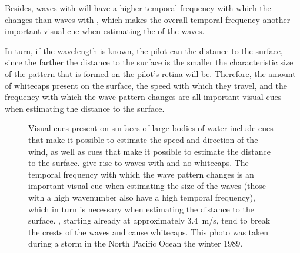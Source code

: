 Besides, waves with  will have a higher temporal frequency with which the  changes than waves with , which makes the overall temporal frequency another important visual cue when estimating the  of the waves.

In turn, if the wavelength is known, the pilot can \estimate the distance to the surface, since the farther the distance to the surface is the smaller the characteristic size of the pattern that is formed on the pilot's retina will be. Therefore, the amount of whitecaps present on the surface, the speed with which they travel, and the frequency with which the wave pattern changes are all important visual cues when estimating the distance to the surface.

\begin{figure}
    \centering
    \caption{Visual cues present on surfaces of large bodies of water include cues that make it possible to estimate the speed and direction of the wind, as well as cues that make it possible to estimate the distance to the surface.   give rise to waves with  and no whitecaps. The temporal frequency with which the wave pattern changes is an important visual cue when estimating the size of the waves (those with a high wavenumber also have a high temporal frequency), which in turn is necessary when estimating the distance to the surface.  , starting already at approximately 3.4~m/s, tend to break the crests of the waves and cause whitecaps. This photo was taken during a storm in the North Pacific Ocean the winter 1989.}
    \label{fig:sea_states}
\end{figure}

